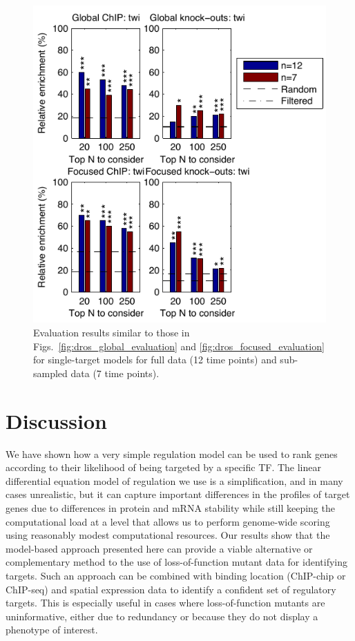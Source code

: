 \documentclass{pnastwo}
\begin{document}
\begin{article}
\begin{figure}[tb]
  \centering
  \includegraphics{fig6}
  \caption{Evaluation results similar to those in 
    Figs.~\ref{fig:dros_global_evaluation} and 
    \ref{fig:dros_focused_evaluation} for single-target models
    for full data (12 time points) and sub-sampled data (7 time points).
    \label{fig:dros_data_size_evaluation}
  }
\end{figure}

\section{Discussion}

We have shown how a very simple regulation model can be used to rank
genes according to their likelihood of being targeted by a specific
TF. The linear differential equation model of regulation we use is a simplification, and in
many cases unrealistic, but it can capture important differences in
the profiles of target genes due to differences in protein and mRNA
stability while still keeping the computational load at a level
that allows us to perform genome-wide scoring using reasonably modest
computational resources. Our results show
that the model-based approach presented here can provide a viable alternative or complementary method to the use of
loss-of-function mutant data for identifying targets. Such an approach
can be combined with binding location (ChIP-chip or ChIP-seq)
and spatial expression data to identify a confident set of regulatory
targets. This is especially useful in cases where loss-of-function
mutants are uninformative, either due to redundancy or because they do
not display a phenotype of interest. 


\end{article}
\end{document}
